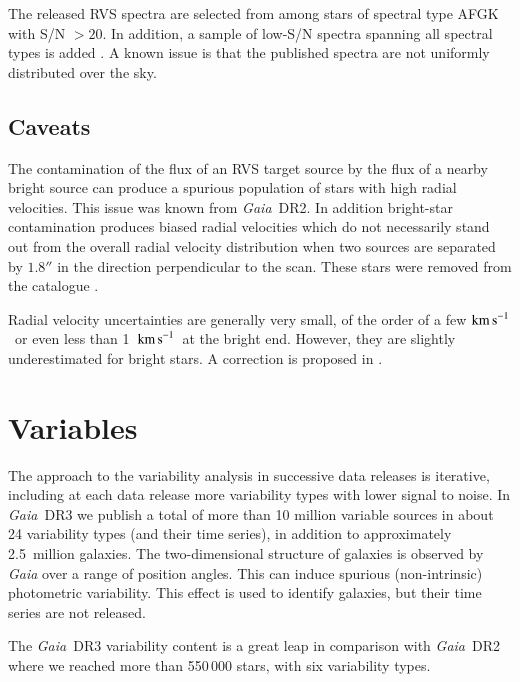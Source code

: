\documentclass[longauth]{aa}
\def\arcsec{\ensuremath{''}}
\providecommand{\kms}{\ensuremath{\textrm{km\,s}^{-1}}}
\providecommand\kms{\ensuremath{\text{\,km\,s}^{-1}}}
\newcommand\gaia{\textit{Gaia}\xspace}
\providecommand\gdrtwo{\textit{Gaia}~DR2\xspace}
\providecommand\gdrthree{\textit{Gaia}~DR3\xspace}
\begin{document}
The released RVS spectra are selected from among stars of spectral type AFGK with S/N $>20$. In addition, a sample of low-S/N spectra spanning all spectral types is added \citep[see][]{DR3-DPACP-154}. A known issue is that the published spectra are not uniformly distributed over the sky.

\subsection{Caveats}

The contamination of the flux of an RVS target source by the flux of a nearby bright source can produce a spurious population of stars with high radial velocities. This issue was known from \gdrtwo \citep{EDR3-DPACP-121}. In addition bright-star contamination produces  biased radial velocities which do not necessarily stand out from the overall radial velocity distribution when two sources  are separated by $1.8\arcsec$ in the direction perpendicular to the scan. These stars were removed from the catalogue \citep{DR3-DPACP-159}.

Radial velocity uncertainties are generally very small, of the order of a few \kms\ or even less than 1~\kms\ at the bright end. However, they are   slightly  underestimated for bright stars. A correction is proposed in \citet{DR3-DPACP-127}.

\section{Variables}\label{ssec:vari}

The approach to the variability analysis in  successive data releases is iterative, including at each data release  more variability types with lower signal to noise. In \gdrthree we publish a total of  more than 10 million variable sources  in about 24 variability types (and their time series), in addition to  approximately 2.5~million galaxies. %
The two-dimensional structure of galaxies is observed  by \gaia  over a range of position angles. This can induce  spurious (non-intrinsic) photometric variability. This effect is used to identify galaxies, but their time series are not released.

The \gdrthree variability content is a great leap in comparison with \gdrtwo where we reached more than 550\,000 stars, with six variability types.
\end{document}
